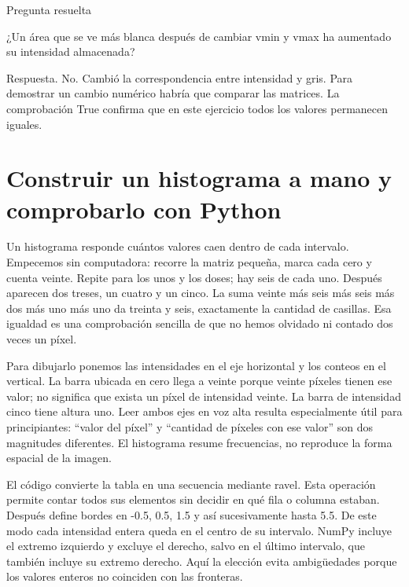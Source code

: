 
\begin{Idea}{Pregunta resuelta}

¿Un área que se ve más blanca después de cambiar vmin y vmax ha aumentado su intensidad almacenada?


Respuesta. No. Cambió la correspondencia entre intensidad y gris. Para demostrar un cambio numérico habría que comparar las matrices. La comprobación True confirma que en este ejercicio todos los valores permanecen iguales.


\end{Idea}

\clearpage

\section{Construir un histograma a mano y comprobarlo con Python}


Un histograma responde cuántos valores caen dentro de cada intervalo. Empecemos sin computadora: recorre la matriz pequeña, marca cada cero y cuenta veinte. Repite para los unos y los doses; hay seis de cada uno. Después aparecen dos treses, un cuatro y un cinco. La suma veinte más seis más seis más dos más uno más uno da treinta y seis, exactamente la cantidad de casillas. Esa igualdad es una comprobación sencilla de que no hemos olvidado ni contado dos veces un píxel.


Para dibujarlo ponemos las intensidades en el eje horizontal y los conteos en el vertical. La barra ubicada en cero llega a veinte porque veinte píxeles tienen ese valor; no significa que exista un píxel de intensidad veinte. La barra de intensidad cinco tiene altura uno. Leer ambos ejes en voz alta resulta especialmente útil para principiantes: “valor del píxel” y “cantidad de píxeles con ese valor” son dos magnitudes diferentes. El histograma resume frecuencias, no reproduce la forma espacial de la imagen.


El código convierte la tabla en una secuencia mediante ravel. Esta operación permite contar todos sus elementos sin decidir en qué fila o columna estaban. Después define bordes en -0.5, 0.5, 1.5 y así sucesivamente hasta 5.5. De este modo cada intensidad entera queda en el centro de su intervalo. NumPy incluye el extremo izquierdo y excluye el derecho, salvo en el último intervalo, que también incluye su extremo derecho. Aquí la elección evita ambigüedades porque los valores enteros no coinciden con las fronteras.


